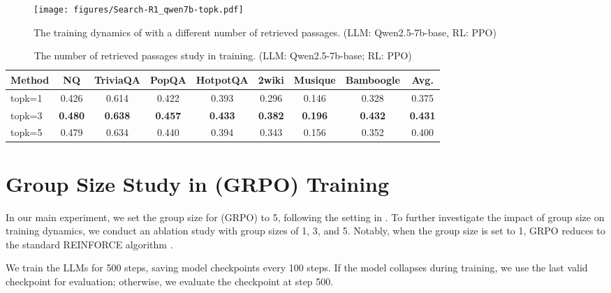 \begin{figure}[h]
    \centering
    \texttt{[image: figures/Search-R1\_qwen7b-topk.pdf]}
    \caption{The training dynamics of \Ours with a different number of retrieved passages. (LLM: Qwen2.5-7b-base, RL: PPO)}
    \label{fig:apx:topk}
\end{figure}

\begin{table}[h]
    \centering
    \scriptsize
    \setlength{\tabcolsep}{3pt}
    
    \caption{The number of retrieved passages study in \Ours training. (LLM: Qwen2.5-7b-base; RL: PPO)}\label{tab:apx:topk}
    \begin{tabular}{lcccccccc}
        \toprule
        \textbf{Method} & \textbf{NQ} & \textbf{TriviaQA} & \textbf{PopQA} & \textbf{HotpotQA} & \textbf{2wiki} & \textbf{Musique} & \textbf{Bamboogle} & \textbf{Avg.} \\
        \midrule
        
        topk=1 & 0.426 & 0.614 & 0.422 & 0.393 & 0.296 & 0.146 & 0.328 & 0.375 \\
        topk=3 & \textbf{0.480} & \textbf{0.638} & \textbf{0.457}	& \textbf{0.433} & \textbf{0.382} & \textbf{0.196} & \textbf{0.432} & \textbf{0.431}  \\
        topk=5 & 0.479 & 0.634 & 0.440 & 0.394 & 0.343 & 0.156 & 0.352 & 0.400 \\
        \bottomrule
    \end{tabular}
\end{table}

\section{Group Size Study in \Ours (GRPO) Training}\label{apx:sec:grpo-size}

In our main experiment, we set the group size for \Ours (GRPO) to 5, following the setting in \citet{sheng2024hybridflow}. To further investigate the impact of group size on training dynamics, we conduct an ablation study with group sizes of 1, 3, and 5. Notably, when the group size is set to 1, GRPO reduces to the standard REINFORCE algorithm \citep{williams1992simple}.

We train the LLMs for 500 steps, saving model checkpoints every 100 steps. If the model collapses during training, we use the last valid checkpoint for evaluation; otherwise, we evaluate the checkpoint at step 500.

